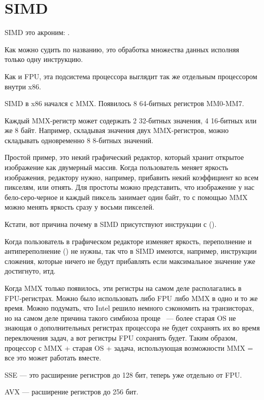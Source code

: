 \section{SIMD}

\label{SIMD_x86}
\ac{SIMD} это акроним: .

Как можно судить по названию, это обработка множества данных исполняя только одну инструкцию.

Как и \ac{FPU}, эта подсистема процессора выглядит так же отдельным процессором внутри x86.

SIMD в x86 начался с MMX. Появилось 8 64-битных регистров MM0-MM7.

Каждый MMX-регистр может содержать 2 32-битных значения, 4 16-битных или же 8 байт. 
Например, складывая значения двух MMX-регистров, можно складывать одновременно 8 8-битных значений.

Простой пример, это некий графический редактор, который хранит открытое изображение как двумерный массив. 
Когда пользователь меняет яркость изображения, редактору нужно, например, прибавить некий коэффициент 
ко всем пикселям, или отнять. 
Для простоты можно представить, что изображение у нас бело-серо-черное и каждый пиксель занимает один байт, 
то с помощью MMX можно менять яркость сразу у восьми пикселей.

Кстати, вот причина почему в SIMD присутствуют инструкции с  ().

Когда пользователь в графическом редакторе изменяет яркость, переполнение и антипереполнение ()
не нужны, так что в SIMD имеются, например, инструкции сложения, которые ничего не будут прибавлять
если максимальное значение уже достигнуто, итд.

Когда MMX только появилось, эти регистры на самом деле располагались в FPU-регистрах. 
Можно было использовать 
либо FPU либо MMX в одно и то же время. Можно подумать, что Intel решило немного сэкономить на транзисторах, 
но на самом деле причина такого симбиоза проще ~--- более старая \ac{OS} не знающая о дополнительных 
регистрах процессора не будет сохранять их во время переключения задач, а вот регистры FPU сохранять будет. 
Таким образом, процессор с MMX + старая \ac{OS} + задача, использующая возможности MMX = все 
это может работать вместе.

SSE --- это расширение регистров до 128 бит, теперь уже отдельно от FPU.

AVX --- расширение регистров до 256 бит.

